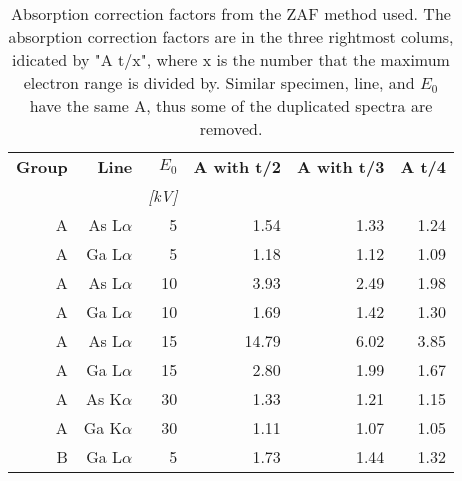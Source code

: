 \begin{table}[phtb]
    \begin{center}
        \caption{
            Absorption correction factors from the ZAF method used.
            The absorption correction factors are in the three rightmost colums, idicated by "A t/x", where x is the number that the maximum electron range is divided by.
            Similar specimen, line, and $E_0$ have the same A, thus some of the duplicated spectra are removed.
        }
        \label{tab:results:ZAF_corrections_factors}
        \begin{tabular}{rrrrrr}
            \hline
            \textbf{ Group} & \textbf{Line} & \textbf{$E_0$} & \textbf{A with t/2} & \textbf{A with t/3} & \textbf{A t/4} \\
            \emph{}         & \emph{}       & \emph{[kV]}    & \emph{}        & \emph{}        & \emph{}        \\
            \hline
            A               & As L$\alpha$  & 5              & 1.54           & 1.33           & 1.24           \\
            A               & Ga L$\alpha$  & 5              & 1.18           & 1.12           & 1.09           \\
            A               & As L$\alpha$  & 10             & 3.93           & 2.49           & 1.98           \\
            A               & Ga L$\alpha$  & 10             & 1.69           & 1.42           & 1.30           \\
            A               & As L$\alpha$  & 15             & 14.79          & 6.02           & 3.85           \\
            A               & Ga L$\alpha$  & 15             & 2.80           & 1.99           & 1.67           \\
            A               & As K$\alpha$  & 30             & 1.33           & 1.21           & 1.15           \\
            A               & Ga K$\alpha$  & 30             & 1.11           & 1.07           & 1.05           \\
            \hline
            B               & Ga L$\alpha$  & 5              & 1.73           & 1.44           & 1.32           \\

\end{tabular}
\end{center}
\end{table}
